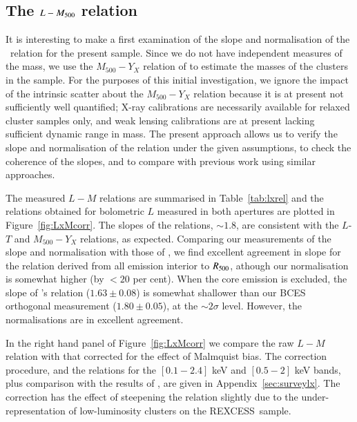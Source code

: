 \documentclass[oldversion]{aa}
\newcommand{\rexcess}{{\gwpfont REXCESS}}
\begin{document}
{%

\subsection{The $L-M_{\rm 500}$ relation}

It is interesting to make a first examination of the slope and normalisation of the \LxM\ relation for the present sample. Since we do not have independent measures of the mass, we use the $M_{500}-Y_X$ relation of \citet{app07} to estimate the masses of the clusters in the sample. For the purposes of this initial investigation, we ignore the impact of the intrinsic scatter about the  $M_{500}-Y_X$ relation because it is at present not sufficiently well quantified; X-ray calibrations are necessarily available for relaxed cluster samples only, and weak lensing calibrations are at present lacking sufficient dynamic range in mass. The present approach allows us to verify the slope and normalisation of the relation under the given assumptions, to check the coherence of the slopes, and to compare with previous work using similar approaches. 

The measured $L-M$ relations are summarised in
Table~\ref{tab:lxrel} and the relations obtained for bolometric $L$
measured in both apertures are plotted in Figure~\ref{fig:LxMcorr}. The slopes of the relations, $\sim 1.8$, are consistent with the $L$-$T$ and $M_{500}-Y_X$ relations, as expected. Comparing our measurements of the slope and normalisation with those of \citet{maughan07}, we find excellent agreement in slope for the
relation derived from all emission interior to $R_{500}$, athough our normalisation is somewhat higher (by $< 20$ per cent). When the core
emission is excluded, the slope of \citeauthor{maughan07}'s
relation ($1.63\pm0.08$) is somewhat shallower than our BCES orthogonal measurement ($1.80\pm0.05$), at the $\sim 2\sigma$ level. However, the normalisations are in excellent agreement. 

In the right hand panel of Figure~\ref{fig:LxMcorr} we compare the raw $L-M$ relation with that corrected for the effect of Malmquist bias. The correction procedure, and the relations for the $[0.1-2.4]$ keV and $[0.5-2]$ keV bands, plus comparison with the results of \citet{vikh08}, are given in Appendix~\ref{sec:surveylx}.
The correction has the effect of steepening the relation slightly due to the under-representation of low-luminosity clusters on the \rexcess\ sample.


}
\end{document}
